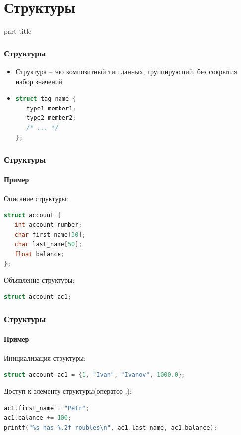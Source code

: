 \documentclass[14pt,pdf,hyperref={unicode}]{beamer}
\begin{document}
\section{Структуры}
\begin{frame}
\begin{center}
\begin{beamercolorbox}[sep=8pt,center]{part
title}
\insertsection
\end{beamercolorbox}
\end{center}
\end{frame}




\begin{frame}[fragile]
\frametitle{Структуры} 
\begin{itemize}
\item Структура -- это композитный тип данных, группирующий, без сокрытия набор значений \\
\item 
\begin{lstlisting}[language=C++,basicstyle=\ttfamily,keywordstyle=\color{blue}]
struct tag_name {
   type1 member1;
   type2 member2;
   /* ... */
};
\end{lstlisting}
\end{itemize}
\end{frame}


\begin{frame}[fragile]
\frametitle{Структуры} 
\framesubtitle{Пример} 
Описание структуры:
\begin{lstlisting}[language=C++,basicstyle=\ttfamily,keywordstyle=\color{blue}]
struct account {
   int account_number;
   char first_name[30];
   char last_name[50];
   float balance;
};
\end{lstlisting}
Объявление структуры:
\begin{lstlisting}[language=C++,basicstyle=\ttfamily,keywordstyle=\color{blue}]
struct account ac1;
\end{lstlisting}
\end{frame}

\begin{frame}[fragile]
\frametitle{Структуры} 
\framesubtitle{Пример} 
Инициализация структуры:
\begin{lstlisting}[language=C++,basicstyle=\ttfamily,keywordstyle=\color{blue}]
struct account ac1 = {1, "Ivan", "Ivanov", 1000.0};
\end{lstlisting}
Доступ к элементу структуры(оператор .):
\begin{lstlisting}[language=C++,basicstyle=\ttfamily,keywordstyle=\color{blue}]
ac1.first_name = "Petr";
ac1.balance += 100;
printf("%s has %.2f roubles\n", ac1.last_name, ac1.balance);
\end{lstlisting}
\end{frame}
\end{document}
